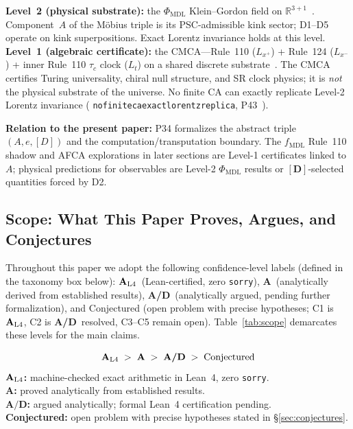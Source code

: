 \documentclass[12pt,letterpaper]{article}
\newcommand{\fmdl}{f_{\mathrm{MDL}}}
\newcommand{\Dclass}{[D]}
\newcommand{\catAL}{\ensuremath{\textbf{A}_{\rm L4}}}
\newcommand{\catA}{\textbf{A}}
\newcommand{\catAD}{\textbf{A/D}}
\newcommand{\lean}[1]{%
  \penalty-100
  \begingroup\def\_{\textunderscore\allowbreak}\texttt{#1}\endgroup}
\begin{document}
\begin{tcolorbox}[colback=blue!3,colframe=blue!40!black,
  title={\textbf{Two-level substrate architecture (canon as of P41--P45)}},
  fonttitle=\bfseries,left=6pt,right=6pt,top=4pt,bottom=4pt]
\small
\textbf{Level~2 (physical substrate):} the $\Phi_{\mathrm{MDL}}$ Klein--Gordon field
on $\mathbb{R}^{3+1}$~\cite{SpivackPhiMDLField,SpivackCompleteness}.  Component~$A$
of the M\"{o}bius triple is its PSC-admissible kink sector; D1--D5 operate on kink
superpositions.  Exact Lorentz invariance holds at this level.
\medskip\noindent
\textbf{Level~1 (algebraic certificate):} the CMCA---Rule~110 ($L_{x^+}$) +
Rule~124 ($L_{x^-}$) + inner Rule~110 $\tau_c$ clock ($L_t$) on a shared discrete
substrate~\cite{SpivackCMCA,SpivackThreeTapeCMCA}.  The CMCA certifies Turing
universality, chiral null structure, and SR clock physics; it is \emph{not} the
physical substrate of the universe.  No finite CA can exactly replicate Level-2
Lorentz invariance (\lean{no\_finite\_ca\_exact\_lorentz\_replica},
P43~\cite{SpivackCompleteness}).

\textbf{Relation to the present paper:} P34 formalizes the abstract triple
$(A, e, \Dclass)$ and the computation/transputation boundary.  The $\fmdl$
Rule~110 shadow and AFCA explorations in later sections are Level-1 certificates
linked to $A$; physical predictions for observables are Level-2 $\Phi_{\mathrm{MDL}}$
results or $[\mathbf{D}]$-selected quantities forced by D2.
\end{tcolorbox}

\subsection{Scope: What This Paper Proves, Argues, and Conjectures}
\label{sec:scope}

Throughout this paper we adopt the following confidence-level labels
(defined in the taxonomy box below):
\catAL\ (Lean-certified, zero \texttt{sorry}), \catA\ (analytically derived from
established results), \catAD\ (analytically argued, pending further formalization),
and Conjectured (open problem with precise hypotheses; C1 is \catAL, C2 is
\catAD\ resolved, C3--C5 remain open).
Table~\ref{tab:scope} demarcates these levels for the main claims.

\begin{tcolorbox}[colback=gray!4,colframe=gray!50!black,
  title={\textbf{Claim-strength taxonomy}},
  fonttitle=\bfseries,left=6pt,right=6pt,top=5pt,bottom=5pt]
\small
\[
\catAL \;>\; \catA \;>\; \catAD \;>\; \text{Conjectured}
\]
\textbf{$\catAL$:} machine-checked exact arithmetic in Lean~4, zero \texttt{sorry}.\\
\textbf{$\catA$:} proved analytically from established results.\\
\textbf{$\catAD$:} argued analytically; formal Lean~4 certification pending.\\
\textbf{Conjectured:} open problem with precise hypotheses stated in \S\ref{sec:conjectures}.
\end{tcolorbox}
\end{document}
